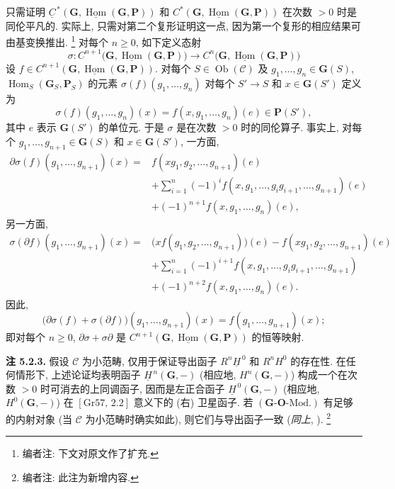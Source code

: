 只需证明
\(\underline C^{\,*}
  (\mathbf G,\underline{\operatorname{Hom}}(\mathbf G,\mathbf P))\) 和
\(C^*(\mathbf G,\underline{\operatorname{Hom}}(\mathbf G,\mathbf P))\)
在次数 \(>0\) 时是同伦平凡的. 实际上, 只需对第二个复形证明这一点,
因为第一个复形的相应结果可由基变换推出.
\footnote{编者注: 下文对原文作了扩充.}
对每个 \(n\geq0\), 如下定义态射
\[
  \sigma:
  C^{n+1}\bigl(
    \mathbf G,\underline{\operatorname{Hom}}(\mathbf G,\mathbf P)
  \bigr)
  \longrightarrow
  C^n\bigl(
    \mathbf G,\underline{\operatorname{Hom}}(\mathbf G,\mathbf P)
  \bigr)
\]
设
\(f\in C^{n+1}
  (\mathbf G,\underline{\operatorname{Hom}}(\mathbf G,\mathbf P))\).
对每个 \(S\in\operatorname{Ob}(\mathscr C)\) 及
\(g_1,\ldots,g_n\in\mathbf G(S)\),
\(\operatorname{Hom}_S(\mathbf G_S,\mathbf P_S)\) 的元素
\(\sigma(f)(g_1,\ldots,g_n)\) 对每个
\(S'\to S\) 和 \(x\in\mathbf G(S')\) 定义为
\[
  \sigma(f)(g_1,\ldots,g_n)(x)
    =f(x,g_1,\ldots,g_n)(e)\in\mathbf P(S'),
\]
其中 \(e\) 表示 \(\mathbf G(S')\) 的单位元. 于是 \(\sigma\)
是在次数 \(>0\) 时的同伦算子. 事实上, 对每个
\(g_1,\ldots,g_{n+1}\in\mathbf G(S)\) 和 \(x\in\mathbf G(S')\), 一方面,
\begin{align*}
  \partial\sigma(f)(g_1,\ldots,g_{n+1})(x)
    ={}&f(xg_1,g_2,\ldots,g_{n+1})(e)\\
     &+\sum_{i=1}^{n}(-1)^i
       f(x,g_1,\ldots,g_i g_{i+1},\ldots,g_{n+1})(e)\\
     &+(-1)^{n+1}f(x,g_1,\ldots,g_n)(e),
\end{align*}
另一方面,
\begin{align*}
  \sigma(\partial f)(g_1,\ldots,g_{n+1})(x)
    ={}&\bigl(xf(g_1,g_2,\ldots,g_{n+1})\bigr)(e)
       -f(xg_1,g_2,\ldots,g_{n+1})(e)\\
     &+\sum_{i=1}^{n}(-1)^{i+1}
       f(x,g_1,\ldots,g_i g_{i+1},\ldots,g_{n+1})\\
     &+(-1)^{n+2}f(x,g_1,\ldots,g_n)(e).
\end{align*}
因此,
\[
  \bigl(\partial\sigma(f)+\sigma(\partial f)\bigr)
    (g_1,\ldots,g_{n+1})(x)
  =f(g_1,\ldots,g_{n+1})(x);
\]
即对每个 \(n\geq0\), \(\partial\sigma+\sigma\partial\) 是
\(C^{n+1}
  (\mathbf G,\underline{\operatorname{Hom}}(\mathbf G,\mathbf P))\) 的恒等映射.

\medskip
\noindent{}\textbf{注 5.2.3.}
假设 \(\mathscr C\) 为小范畴, 仅用于保证导出函子
\(R^n\underline H^{\,0}\) 和 \(R^nH^0\) 的存在性.
在任何情形下, 上述论证均表明函子
\(\underline H^{\,n}(\mathbf G,-)\) (相应地,
\(H^n(\mathbf G,-)\)) 构成一个在次数 \(>0\) 时可消去的上同调函子,
因而是左正合函子 \(\underline H^{\,0}(\mathbf G,-)\) (相应地,
\(H^0(\mathbf G,-)\)) 在 \([\mathrm{Gr}57,\,2.2]\) 意义下的 (右) 卫星函子.
若 \((\mathbf G\text{-}\mathbf O\text{-Mod.})\) 有足够的内射对象
(当 \(\mathscr C\) 为小范畴时确实如此), 则它们与导出函子一致
(\emph{同上}, ).
\footnote{编者注: 此注为新增内容.}

